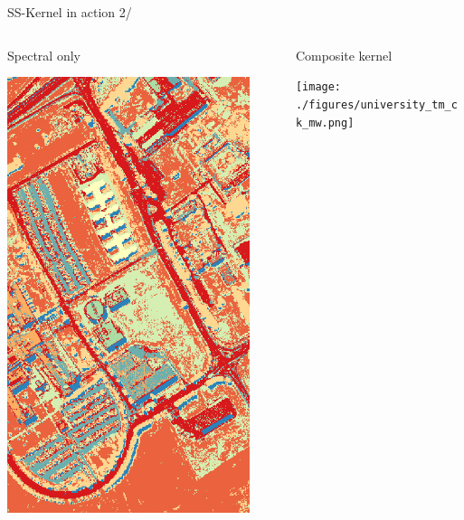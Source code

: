 \documentclass[10pt,aspectratio=1610]{beamer}
\begin{document}
\begin{frame}[label={sec:orgfff130f}]{SS-Kernel in action 2/}
\begin{columns}
\begin{column}{0.3\columnwidth}
\begin{block}{Spectral only}
\begin{center}
\includegraphics[width=0.9\textwidth]{./figures/mrf_labels.png}
\end{center}
\end{block}
\end{column}

\begin{column}{0.3\columnwidth}
\begin{block}{Composite kernel}
\begin{center}
\texttt{[image: ./figures/university\_tm\_ck\_mw.png]}
\end{center}
\end{block}
\end{column}


\end{columns}
\end{frame}
\end{document}
